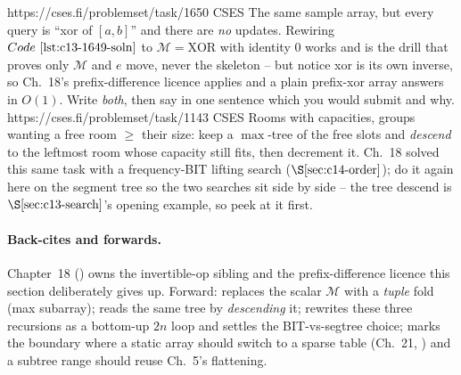 \begin{practiceset}
    {https://cses.fi/problemset/task/1650}
    {CSES}
    {The same sample array, but every query is ``xor of \([a,b]\)'' and there are
     \emph{no} updates.  Rewiring \(\coderef{c13-1649-soln}\) to
     \(\mathcal{M}=\text{XOR}\) with identity \(0\) works and is the drill that
     proves only \(\mathcal{M}\) and \(e\) move, never the skeleton -- but notice
     xor is its own inverse, so Ch.~18's prefix-difference licence applies and a
     plain prefix-xor array answers in \(O(1)\).  Write \emph{both}, then say in
     one sentence which you would submit and why.}
    {https://cses.fi/problemset/task/1143}
    {CSES}
    {Rooms with capacities, groups wanting a free room \(\ge\) their size: keep a
     \(\max\)-tree of the free slots and \emph{descend} to the leftmost room whose
     capacity still fits, then decrement it.  Ch.~18 solved this same task with a
     frequency-BIT lifting search (\(\secref{c14-order}\)); do it again here on
     the segment tree so the two searches sit side by side -- the tree descend is
     \(\secref{c13-search}\)'s opening example, so peek at it first.}
\end{practiceset}

\paragraph{Back-cites and forwards.}
Chapter~18 () owns the invertible-op sibling and the prefix-difference
licence this section deliberately gives up.  Forward: 
replaces the scalar \(\mathcal{M}\) with a \emph{tuple} fold (max subarray);
 reads the same tree by \emph{descending} it;
 rewrites these three recursions as a bottom-up \(2n\) loop and
settles the BIT-vs-segtree choice;  marks the boundary where
a static array should switch to a sparse table (Ch.~21, ) and a
subtree range should reuse Ch.~5's flattening.

